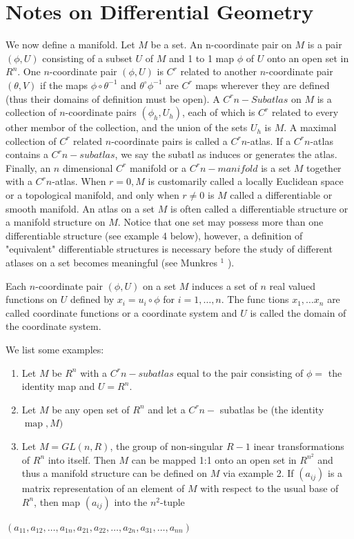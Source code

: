 \documentclass[10pt]{article}
\begin{document}
\section{Notes on Differential Geometry}
We now define a manifold. Let $M$ be a set. An n-coordinate pair on $M$ is a pair $(\phi, U)$ consisting of a subset $U$ of $M$ and 1 to 1 map $\phi$ of $U$ onto an open set in $R^{n}$. One $n$-coordinate pair $(\phi, U)$ is $C^{r}$ related to another $n$-coordinate pair $(\theta, V)$ if the maps $\phi \circ \theta^{-1}$ and $\theta^{\circ} \phi^{-1}$ are $C^{r}$ maps wherever they are defined (thus their domains of definition must be open). A $C^{r} n-S u b a t l a s$ on $M$ is a collection of $n$-coordinate pairs $\left(\phi_{h}, U_{h}\right)$, each of which is $C^{r}$ related to every other membor of the collection, and the union of the sets $U_{h}$ is $M .$ A maximal collection of $C^{r}$ related $n$-coordinate pairs is called a $C^{r} n$-atlas. If a $C^{r} n$-atlas contains a $C^{r} n-s u b a t l a s$, we say the subatl as induces or generates the atlas. Finally, an $n$ dimensional $C^{r}$ manifold or a $C^{r} n-m a n i f o l d$ is a set $M$ together with a $C^{r} n$-atlas. When $r=0, M$ is customarily called a locally Euclidean space or a topological manifold, and only when $r \neq 0$ is $M$ called a differentiable or smooth manifold. An atlas on a set $M$ is often called a differentiable structure or a manifold structure on $M$. Notice that one set may possess more than one differentiable structure (see example 4 below), however, a definition of "equivalent" differentiable structures is necessary before the study of different atlases on a set becomes meaningful (see Munkres ${ }^{1}$ ).

Each $n$-coordinate pair $(\phi, U)$ on a set $M$ induces a set of $n$ real valued functions on $U$ defined by $x_{i}=u_{i} \circ \phi$ for $i=1, \ldots, n$. The func tions $x_{1}, \ldots x_{n}$ are called coordinate functions or a coordinate system and $U$ is called the domain of the coordinate system.

We list some examples:

\begin{enumerate}
  \item Let $M$ be $R^{n}$ with a $C^{r} n-s u b a t l a s$ equal to the pair consisting of $\phi=$ the identity map and $U=R^{n}$.

  \item Let $M$ be any open set of $R^{n}$ and let a $C^{r} n-$ subatlas be (the identity $\operatorname{map}, M)$

  \item Let $M=G L(n, R)$, the group of non-singular $R-1$ inear transformations of $R^{n}$ into itself. Then $M$ can be mapped 1:1 onto an open set in $R^{n^{2}}$ and thus a manifold structure can be defined on $M$ via example 2. If $\left(a_{i j}\right)$ is a matrix representation of an element of $M$ with respect to the usual base of $R^{n}$, then map $\left(a_{i j}\right)$ into the $n^{2}$-tuple

\end{enumerate}
$\left(a_{11}, a_{12}, \ldots, a_{1 n}, a_{21}, a_{22}, \ldots, a_{2 n}, a_{31}, \ldots, a_{n n}\right)$
\end{document}
